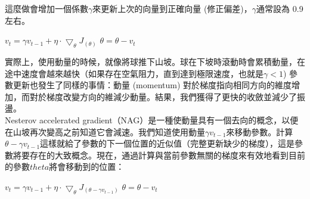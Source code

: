 \begin{itemize}
\begin{figure}[hbt!]
\begin{center}
\end{center}
\end{figure}

這麼做會增加一個係數$\gamma$來更新上次的向量到正確向量 (修正偏差)，$\gamma$通常設為 0.9 左右。
\begin{center}
$v_t = \gamma v_{t-1}+\eta\cdot\bigtriangledown_{\theta}J_{(\theta)}$
$\theta = \theta-v_t$
\end{center}
 實際上，使用動量的時候，就像將球推下山坡。球在下坡時滾動時會累積動量，在途中速度會越來越快（如果存在空氣阻力，直到達到極限速度，也就是$\gamma < 1$) 參數更新也發生了同樣的事情：動量 (momentum) 對於梯度指向相同方向的維度增加，而對於梯度改變方向的維減少動量。結果，我們獲得了更快的收斂並減少了振盪。\\

 Nesterov accelerated gradient（NAG）是一種使動量具有一個去向的概念，以便在山坡再次變高之前知道它會減速。我們知道使用動量$\gamma v_{t-1}$來移動參數。計算$\theta - \gamma v_{t-1}$這樣就給了參數的下一個位置的近似值（完整更新缺少的梯度），這是參數將要存在的大致概念。現在，通過計算與當前參數無關的梯度來有效地看到目前的參數$theta$將會移動到的位置：
\begin{center}
$v_t = \gamma v_{t-1}+\eta\cdot\bigtriangledown_{\theta}J_{(\theta-\gamma v_{t-1})}$
$\theta = \theta - v_t$
\end{center}


\end{itemize}
